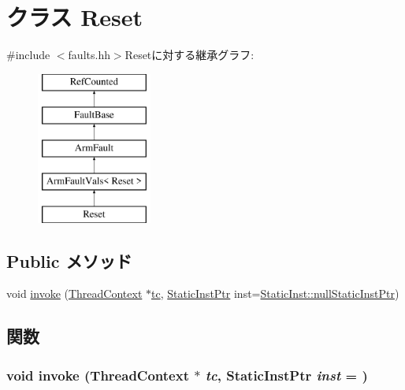 \hypertarget{classArmISA_1_1Reset}{
\section{クラス Reset}
\label{classArmISA_1_1Reset}
}


{\ttfamily \#include $<$faults.hh$>$}Resetに対する継承グラフ:\begin{figure}[H]
\begin{center}
\leavevmode
\includegraphics[height=5cm]{classArmISA_1_1Reset}
\end{center}
\end{figure}
\subsection*{Public メソッド}
\begin{DoxyCompactItemize}
\item 
void \hyperlink{classArmISA_1_1Reset_a2bd783b42262278d41157d428e1f8d6f}{invoke} (\hyperlink{classThreadContext}{ThreadContext} $\ast$\hyperlink{namespaceArmISA_a5aff829af55e65b802d83dfcef4e9dd0}{tc}, \hyperlink{classRefCountingPtr}{StaticInstPtr} inst=\hyperlink{classStaticInst_aa793d9793af735f09096369fb17567b6}{StaticInst::nullStaticInstPtr})
\end{DoxyCompactItemize}


\subsection{関数}
\hypertarget{classArmISA_1_1Reset_a2bd783b42262278d41157d428e1f8d6f}{
\subsubsection[{invoke}]{\setlength{\rightskip}{0pt plus 5cm}void invoke ({\bf ThreadContext} $\ast$ {\em tc}, \/  {\bf StaticInstPtr} {\em inst} = {})}}
\label{classArmISA_1_1Reset_a2bd783b42262278d41157d428e1f8d6f}


